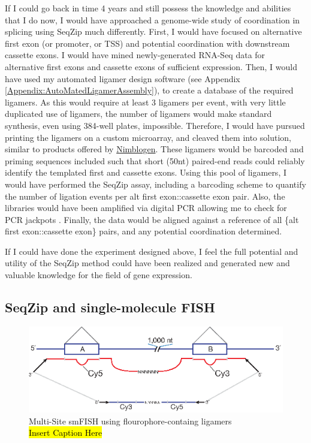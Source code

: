     If I could go back in time 4 years and still possess the knowledge and abilities that I do now, I would have approached a genome-wide study of coordination in splicing using SeqZip much differently. First, I would have focused on alternative first exon (or promoter, or TSS) and potential coordination with downstream cassette exons. I would have mined newly-generated RNA-Seq data \citep{Wang2008, Pan2008} for alternative first exons and cassette exons of sufficient expression. Then, I would have used my automated ligamer design software (see Appendix \ref{Appendix:AutoMatedLigamerAssembly}), to create a database of the required ligamers. As this would require at least 3 ligamers per event, with very little duplicated use of ligamers, the number of ligamers would make standard synthesis, even using 384-well plates, impossible. Therefore, I would have pursued printing the ligamers on a custom microarray, and cleaved them into solution, similar to products offered by \href{http://www.nimblegen.com/}{Nimblogen}. These ligamers would be barcoded and priming sequences included such that short (50nt) paired-end reads could reliably identify the templated first and cassette exons. Using this pool of ligamers, I would have performed the SeqZip assay, including a barcoding scheme to quantify the number of ligation events per {alt first exon::cassette exon} pair. Also, the libraries would have been amplified via digital PCR allowing me to check for PCR jackpots \citep{Shiroguchi2012a}. Finally, the data would be aligned against a reference of all \{alt first exon::cassette exon\} pairs, and any potential coordination determined.

    If I could have done the experiment designed above, I feel the full potential and utility of the SeqZip method could have been realized and generated new and valuable knowledge for the field of gene expression.

  \subsection{SeqZip and single-molecule FISH}
    \label{Disc:subsec:SeqZip and Single-Molecule FISH}

    \begin{figure} %
      \centering 
      \includegraphics{Figures/Discussion/MultiSiteFish.eps}
      \caption[Multi-Site smFISH using flourophore-containg ligamers]
      {Multi-Site smFISH using flourophore-containg ligamers \\[0.25cm]
        \hl{Insert Caption Here}
        }
      \label{Disc:fig:MultiSite FISH using SeqZip}
      \end{figure}

